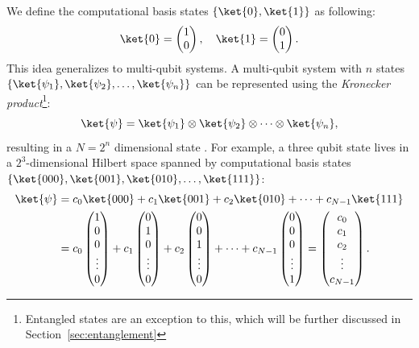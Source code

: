 \documentclass[a4paper,10pt]{article}
\newcommand{\qstatezero}{
	\begin{pmatrix}1 \\ 0\end{pmatrix}
}
\newcommand{\qstateone}{
	\begin{pmatrix}0 \\ 1\end{pmatrix}
}
\begin{document}
We define the computational basis states $\{\ket{0}, \ket{1}\}$ as following:
\begin{equation}
\ket{0} = \qstatezero{}, \quad
\ket{1} = \qstateone{}.
\end{equation}
This idea generalizes to multi-qubit systems.
A multi-qubit system with $n$ states $\{\ket{\psi_1}, \ket{\psi_2}, \ldots, \ket{\psi_n}\}$ can be represented using the \emph{Kronecker product}\footnote{Entangled states are an exception to this, which will be further discussed in Section~\ref{sec:entanglement}}:
\begin{equation}
\ket{\psi} = \ket{\psi_1} \otimes \ket{\psi_2} \otimes \dotsm \otimes \ket{\psi_n},
\end{equation}
resulting in a $N = 2^n$ dimensional state \ket{\psi}.
For example, a three qubit state lives in a  $2^3$-dimensional Hilbert space spanned by computational basis states $\{\ket{000}, \ket{001}, \ket{010}, \ldots, \ket{111}\}$:
\begin{equation}
\begin{aligned}
\ket{\psi} &= c_0\ket{000} + c_1\ket{001} + c_2\ket{010} + \dotsm + c_{N-1}\ket{111} \\
&= c_0\begin{pmatrix}1 \\ 0 \\ 0 \\ \vdots \\ 0\end{pmatrix} + c_1\begin{pmatrix}0 \\ 1 \\ 0 \\ \vdots \\ 0\end{pmatrix} + c_2\begin{pmatrix}0 \\ 0 \\ 1 \\ \vdots \\ 0\end{pmatrix} + \dotsm + c_{N-1}\begin{pmatrix}0 \\ 0 \\ 0 \\ \vdots \\ 1\end{pmatrix} = \begin{pmatrix}c_0 \\ c_1 \\ c_2 \\ \vdots \\ c_{N-1}\end{pmatrix}.
\end{aligned}
\end{equation}
\end{document}
